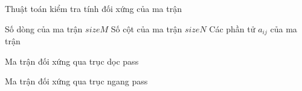 \documentclass[a4paper]{article}
\begin{document}
\begin{algorithm}
\caption{Thuật toán kiểm tra tính đối xứng của ma trận}\label{alg:cap}
\begin{algorithmic}
\Require Số dòng của ma trận $sizeM$
\Require Số cột của ma trận $sizeN$
\Require Các phần tử $a_{ij}$ của ma trận

            \State Ma trận đối xứng qua trục dọc
        \Else
            \State pass
        \EndIf
    \EndFor
\EndFor

            \State Ma trận đối xứng qua trục ngang
        \Else
            \State pass
        \EndIf
    \EndFor
\EndFor
\end{algorithmic}
\end{algorithm}
\end{document}
